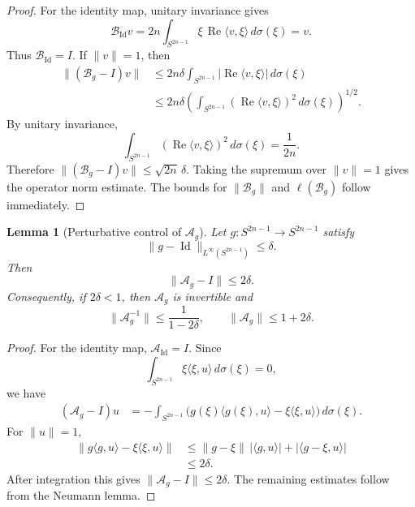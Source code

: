 \documentclass[11pt]{article}
\newtheorem{lemma}[theorem]{Lemma}
\theoremstyle{definition}
\theoremstyle{remark}
\theoremstyle{definition}
\newcommand{\Id}{\operatorname{Id}}
\newcommand{\Real}{\operatorname{Re}}
\begin{document}
\begin{proof}
For the identity map, unitary invariance gives
\[
        \mathcal B_{\Id}v
        =2n\int_{S^{2n-1}}\xi\,\Real\langle v,\xi\rangle\,d\sigma(\xi)
        =v.
\]
Thus \(\mathcal B_{\Id}=I\).  If \(\|v\|=1\), then
\[
\begin{aligned}
        \| (\mathcal B_g-I)v\|
        &\le
        2n\delta\int_{S^{2n-1}}
        |\Real\langle v,\xi\rangle|\,d\sigma(\xi)  \\
        &\le
        2n\delta
        \left(
        \int_{S^{2n-1}}(\Real\langle v,\xi\rangle)^2\,d\sigma(\xi)
        \right)^{1/2}.
\end{aligned}
\]
By unitary invariance,
\[
        \int_{S^{2n-1}}(\Real\langle v,\xi\rangle)^2\,d\sigma(\xi)
        =\frac1{2n}.
\]
Therefore \(\|(\mathcal B_g-I)v\|\le\sqrt{2n}\,\delta\).  Taking the supremum
over \(\|v\|=1\) gives the operator norm estimate.  The bounds for
\(\|\mathcal B_g\|\) and \(\ell(\mathcal B_g)\) follow immediately.
\end{proof}

\begin{lemma}[Perturbative control of \(\mathcal A_g\)]\label{lemma-Ag-perturbative}
Let \(g:S^{2n-1}\to S^{2n-1}\) satisfy
\[
        \|g-\Id\|_{L^\infty(S^{2n-1})}\le\delta.
\]
Then
\[
        \|\mathcal A_g-I\|\le2\delta.
\]
Consequently, if \(2\delta<1\), then \(\mathcal A_g\) is invertible and
\[
        \|\mathcal A_g^{-1}\|\le\frac1{1-2\delta},
        \qquad
        \|\mathcal A_g\|\le1+2\delta.
\]
\end{lemma}

\begin{proof}
For the identity map, \(\mathcal A_{\Id}=I\).  Since
\[
        \int_{S^{2n-1}}\xi\langle \xi,u\rangle\,d\sigma(\xi)=0,
\]
we have
\[
\begin{aligned}
        (\mathcal A_g-I)u
        &=-\int_{S^{2n-1}}
        \bigl(g(\xi)\langle g(\xi),u\rangle
        -\xi\langle \xi,u\rangle\bigr)\,d\sigma(\xi).
\end{aligned}
\]
For \(\|u\|=1\),
\[
\begin{aligned}
        \|g\langle g,u\rangle-\xi\langle \xi,u\rangle\|
        &\le
        \|g-\xi\|\,|\langle g,u\rangle|
        +|\langle g-\xi,u\rangle|  \\
        &\le 2\delta.
\end{aligned}
\]
After integration this gives \(\|\mathcal A_g-I\|\le2\delta\).  The remaining
estimates follow from the Neumann lemma.
\end{proof}
\end{document}
